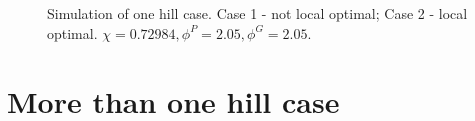 \begin{figure}[ht]
\begin{center}
{  } 
  \caption{Simulation of one hill case. Case 1 - not local optimal; Case 2 - local optimal. $ \chi = 0.72984 , \phi^{P} = 2.05 , \phi^{G} = 2.05 $.} 
\end{center}
\end{figure}

\section{More than one hill case}
\label{sec:more_than_one_hill_case}

